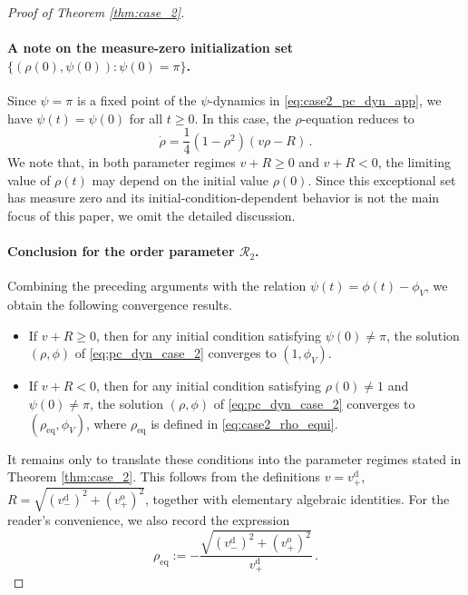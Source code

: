 \documentclass[10pt]{article}
\theoremstyle{definition}
\theoremstyle{definition}
\numberwithin{equation}{section}
\newcommand{\CR}{\mathcal{R}}
\newcommand{\vDPlus}{v_+^{\text{d}}}
\newcommand{\vDMinus}{v_-^{\text{d}}}
\newcommand{\vOPlus}{v_+^{\text{o}}}
\newcommand{\Drho}{\Dot{\rho}}
\newcommand{\phiV}{\phi_{V}}
\newcommand{\rhoEq}{\rho_{\mathrm{eq}}}
\begin{document}
\begin{proof}[Proof of Theorem \ref{thm:case_2}]
\paragraph{A note on the measure-zero initialization set $\{(\rho(0), \psi(0)): \psi(0) = \pi\}$.}
Since $\psi = \pi$ is a fixed point of the $\psi$-dynamics in \eqref{eq:case2_pc_dyn_app}, we have $\psi(t) = \psi(0)$ for all $t \geq 0$.
In this case, the $\rho$-equation reduces to
\[
\Drho = \frac{1}{4}(1-\rho^2) (v\rho - R) \, .
\]
We note that, in both parameter regimes $v + R \geq 0$ and $v+R < 0$, the limiting value of $\rho(t)$ may depend on the initial value $\rho(0)$.
Since this exceptional set has measure zero and its initial-condition-dependent behavior is not the main focus of this paper, we omit the detailed discussion.

\paragraph{Conclusion for the order parameter $\CR_2$.}
Combining the preceding arguments with the relation $\psi(t) = \phi(t) - \phiV$, we obtain the following convergence results.
\begin{itemize}
    \item If $v + R \geq 0$, then for any initial condition satisfying $\psi(0) \neq \pi$, the solution $(\rho, \phi)$ of \eqref{eq:pc_dyn_case_2} converges to $(1, \phiV)$.

    \item If $v + R < 0$, then for any initial condition satisfying $\rho(0) \neq 1$ and $\psi(0) \neq \pi$, the solution $(\rho, \phi)$ of \eqref{eq:pc_dyn_case_2} converges to $(\rhoEq, \phiV)$, where $\rhoEq$ is defined in \eqref{eq:case2_rho_equi}.
\end{itemize}

It remains only to translate these conditions into the parameter regimes stated in Theorem \ref{thm:case_2}.
This follows from the definitions $v = \vDPlus$, $R = \sqrt{(\vDMinus)^2 + (\vOPlus)^2}$, together with elementary algebraic identities.
For the reader's convenience, we also record the expression
\begin{equation}\label{eq:case2_rhoEq}
\rhoEq := - \frac{\sqrt{(\vDMinus)^2 + (\vOPlus)^2}}{\vDPlus} \, .
\end{equation}
\end{proof}
\end{document}
